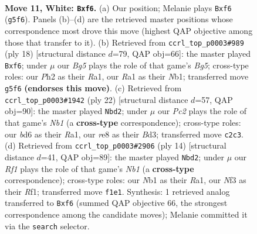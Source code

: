 \documentclass[11pt]{article}
\begin{document}
\clearpage

\begin{figure}[p]\centering
\begin{subfigure}{0.46\textwidth}\centering
\resizebox{\linewidth}{!}{%
\newchessgame
\chessboard[
  setfen={rnbqr1k1/pp3ppp/3b1n2/3p2B1/3p4/3B1N2/PPP2PPP/RN1Q1RK1 w - - 0 11},
  showmover=false,
  pgfstyle=straightmove, color=movearrow, markmove={g5-f6}
]}
\caption{}
\end{subfigure}\hfill
\begin{subfigure}{0.46\textwidth}\centering
\resizebox{\linewidth}{!}{%
\newchessgame
\chessboard[
  setfen={r1bqk2r/pp3pp1/2nbpn1p/6B1/2Pp4/3P1NP1/PP3PBP/RN1Q1RK1 w kq - 0 10},
  showmover=false,
  pgfstyle=straightmove, color=movearrow, markmove={g5-f6}
]}
\caption{}
\end{subfigure}
\\[4pt]
\begin{subfigure}{0.46\textwidth}\centering
\resizebox{\linewidth}{!}{%
\newchessgame
\chessboard[
  setfen={rn1q1rk1/1p3ppp/p2b1n2/3p2B1/3P2b1/1PPB1N2/5PPP/RN1Q1RK1 w - - 7 12},
  showmover=false,
  pgfstyle=straightmove, color=movearrow, markmove={b1-d2}
]}
\caption{}
\end{subfigure}\hfill
\begin{subfigure}{0.46\textwidth}\centering
\resizebox{\linewidth}{!}{%
\newchessgame
\chessboard[
  setfen={rn1q1rk1/ppp2ppp/3b1n2/3p2B1/3P2b1/3B1N2/PPP2PPP/RN1Q1RK1 w - - 8 8},
  showmover=false,
  pgfstyle=straightmove, color=movearrow, markmove={b1-d2}
]}
\caption{}
\end{subfigure}
\caption{\textbf{Move 11, White: \texttt{Bxf6}.} (a) Our position; Melanie plays \texttt{Bxf6} (\texttt{g5f6}). Panels (b)--(d) are the retrieved master positions whose correspondence most drove this move (highest QAP objective among those that transfer to it). (b) Retrieved from \texttt{ccrl\_top\_p0003\#989} (ply 18) [structural distance $d$=79, QAP obj=66]: the master played \texttt{Bxf6}; under $\mu$ our \emph{Bg5} plays the role of that game's \emph{Bg5}; cross-type roles: our \emph{P}h2 as their \emph{R}a1, our \emph{R}a1 as their \emph{N}b1; transferred move \texttt{g5f6} \textbf{(endorses this move)}. (c) Retrieved from \texttt{ccrl\_top\_p0003\#1942} (ply 22) [structural distance $d$=57, QAP obj=90]: the master played \texttt{Nbd2}; under $\mu$ our \emph{Pc2} plays the role of that game's \emph{Nb1} (a \textbf{cross-type} correspondence); cross-type roles: our \emph{b}d6 as their \emph{R}a1, our \emph{r}e8 as their \emph{B}d3; transferred move \texttt{c2c3}. (d) Retrieved from \texttt{ccrl\_top\_p0003\#2906} (ply 14) [structural distance $d$=41, QAP obj=89]: the master played \texttt{Nbd2}; under $\mu$ our \emph{Rf1} plays the role of that game's \emph{Nb1} (a \textbf{cross-type} correspondence); cross-type roles: our \emph{N}b1 as their \emph{R}a1, our \emph{N}f3 as their \emph{R}f1; transferred move \texttt{f1e1}. Synthesis: 1 retrieved analog transferred to \texttt{Bxf6} (summed QAP objective 66, the strongest correspondence among the candidate moves); Melanie committed it via the \texttt{search} selector.}
\label{fig:thought-m20}
\end{figure}
\end{document}
